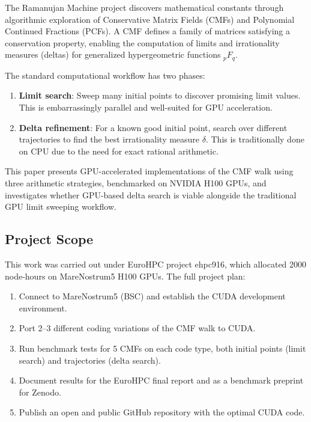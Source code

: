 \documentclass[11pt,a4paper]{article}
\begin{document}
The Ramanujan Machine project \cite{ramanujan-machine} discovers mathematical
constants through algorithmic exploration of Conservative Matrix Fields
(CMFs) and Polynomial Continued Fractions (PCFs). A CMF defines a family of
matrices satisfying a conservation property, enabling the computation of
limits and irrationality measures (deltas) for generalized hypergeometric
functions ${}_pF_q$.

The standard computational workflow has two phases:
\begin{enumerate}[leftmargin=2cm]
    \item \textbf{Limit search}: Sweep many initial points to discover
    promising limit values. This is embarrassingly parallel and well-suited
    for GPU acceleration.
    \item \textbf{Delta refinement}: For a known good initial point, search
    over different trajectories to find the best irrationality measure
    $\delta$. This is traditionally done on CPU due to the need for exact
    rational arithmetic.
\end{enumerate}

This paper presents GPU-accelerated implementations of the CMF walk using
three arithmetic strategies, benchmarked on NVIDIA H100 GPUs, and
investigates whether GPU-based delta search is viable alongside the
traditional GPU limit sweeping workflow.

\subsection{Project Scope}

This work was carried out under EuroHPC project ehpc916, which allocated
2000 node-hours on MareNostrum5 H100 GPUs. The full project plan:

\begin{enumerate}[leftmargin=2cm]
    \item Connect to MareNostrum5 (BSC) and establish the CUDA development environment.
    \item Port 2--3 different coding variations of the CMF walk to CUDA.
    \item Run benchmark tests for 5 CMFs on each code type, both initial
    points (limit search) and trajectories (delta search).
    \item Document results for the EuroHPC final report and as a benchmark
    preprint for Zenodo.
    \item Publish an open and public GitHub repository with the optimal
    CUDA code.
\end{enumerate}
\end{document}
